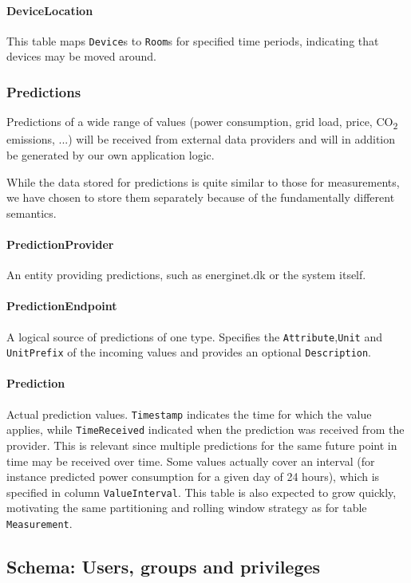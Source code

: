 \documentclass{report}
\begin{document}
\paragraph{DeviceLocation} This table maps \texttt{Device}s to \texttt{Room}s for specified time periods, indicating that devices may be moved around.

\subsubsection{Predictions}
Predictions of a wide range of values (power consumption, grid load, price, CO\textsubscript{2} emissions, ...) will be received from external data providers and will in addition be generated by our own application logic. 

While the data stored for predictions is quite similar to those for measurements, we have chosen to store them separately because of the fundamentally different semantics.

\paragraph{PredictionProvider}
An entity providing predictions, such as energinet.dk or the system itself.

\paragraph{PredictionEndpoint} 
A logical source of predictions of one type. Specifies the \texttt{Attribute},\texttt{Unit} and \texttt{UnitPrefix} of the incoming values and provides an optional \texttt{Description}.

\paragraph{Prediction}
Actual prediction values. \texttt{Timestamp} indicates the time for which the value applies, while \texttt{TimeReceived} indicated when the prediction was received from the provider. This is relevant since multiple predictions for the same future point in time may be received over time. Some values actually cover an interval (for instance predicted power consumption for a given day of 24 hours), which is specified in column \texttt{ValueInterval}.
This table is also expected to grow quickly, motivating the same partitioning and rolling window strategy as for table \texttt{Measurement}.

\subsection{Schema: Users, groups and privileges}
\end{document}
